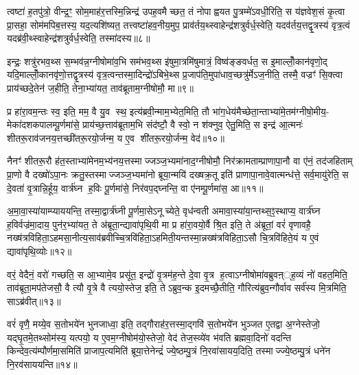 त्वष्टा॑ ह॒तपु॑त्रो॒ वीन्द्र॒ꣳ॒ सोम॒माह॑र॒त्तस्मि॒न्निन्द्र॑ उपह॒वमैच्छत॒ तं नोपाह्वयत पु॒त्रम्मे॑ऽवधी॒रिति॒ स य॑ज्ञवेश॒सं कृ॒त्वा प्रा॒सहा॒ सोम॑मपिब॒त्तस्य॒ यद॒त्यशि॑ष्यत॒ तत्त्वष्टा॑हव॒नीय॒मुप॒ प्राव॑र्तय॒थ्स्वाहेन्द्र॑शत्रुर्वर्ध॒स्वेति॒ यदव॑र्तय॒त्तद्वृ॒त्रस्य॑ वृत्र॒त्वं यदब्र॑वी॒थ्स्वाहेन्द्र॑शत्रुर्वर्ध॒स्वेति॒ तस्मा॑दस्य॥८॥

इन्द्रः॒ शत्रु॑रभव॒थ्स स॒म्भव॑न्न॒ग्नीषोमा॑व॒भि सम॑भव॒थ्स इ॑षुमा॒त्रमि॑षुमात्रं॒ विष्व॑ङ्ङवर्धत॒ स इ॒माल्लोँ॒कान॑वृणो॒द् यदि॒माल्लोँ॒कानवृ॑णो॒त्तद्वृ॒त्रस्य॑ वृत्र॒त्वन्तस्मा॒दिन्द्रो॑ऽबिभे॒थ्स प्र॒जाप॑ति॒मुपा॑धाव॒च्छत्रु॑र्मेऽज॒नीति॒ तस्मै॒ वज्रꣳ॑ सि॒क्त्वा प्राय॑च्छदे॒तेन॑ ज॒हीति॒ तेना॒भ्या॑यत॒ ताव॑ब्रूताम॒ग्नीषोमौ॒ मा॥९॥

प्र हा॑रा॒वम॒न्तः स्व॒ इति॒ मम॒ वै यु॒व स्थ॒ इत्य॑ब्रवी॒न्माम॒भ्येत॒मिति॒ तौ भा॑ग॒धेय॑मैच्छेता॒न्ताभ्या॑मे॒तम॑ग्नीषो॒मीय॒- मेका॑दशकपालम्पू॒र्णमा॑से॒ प्राय॑च्छ॒त्ताव॑ब्रूताम॒भि संद॑ष्टौ॒ वै स्वो॒ न श॑क्नुव॒ ऐतु॒मिति॒ स इन्द्र॑ आ॒त्मनः॑ शीतरू॒राव॑जनय॒त्तच्छी॑तरू॒रयो॒र्जन्म॒ य ए॒व शी॑तरू॒रयो॒र्जन्म॒ वेद॑॥१०॥

नैनꣳ॑ शीतरू॒रौ ह॑त॒स्ताभ्या॑मेनम॒भ्य॑नय॒त्तस्माज्जञ्ज॒भ्यमा॑नाद॒ग्नीषोमौ॒ निर॑क्रामताम्प्राणापा॒नौ वा ए॑नं॒ तद॑जहिताम् प्रा॒णो वै दख्षो॑ऽपा॒नः क्रतु॒स्तस्माज्जञ्ज॒भ्यमा॑नो ब्रूया॒न्मयि॑ दख्षक्र॒तू इति॑ प्राणापा॒नावे॒वात्मन्ध॑त्ते॒ सर्व॒मायु॑रेति॒ स दे॒वता॑ वृ॒त्रान्नि॒र्\mbox{}हूय॒ वार्त्र॑घ्न ह॒विः पू॒र्णमा॑से॒ निर॑वप॒द्घ्नन्ति॒ वा ए॑नम्पू॒र्णमा॑स॒ आ॥११॥

अ॒मा॒वा॒स्या॑याम्प्याययन्ति॒ तस्मा॒द्वार्त्र॑घ्नी पू॒र्णमा॒सेऽनूच्येते॒ वृध॑न्वती अमावा॒स्या॑या॒न्तथ्स॒ꣵ॒स्थाप्य॒ वार्त्र॑घ्न ह॒विर्वज्र॑मा॒दाय॒ पुन॑र॒भ्या॑यत॒ ते अ॑ब्रूता॒न्द्यावा॑पृथि॒वी मा प्र हा॑रा॒वयो॒र्वै श्रि॒त इति॒ ते अ॑ब्रूतां॒ वरं॑ वृणावहै॒ नख्ष॑त्रविहिता॒ऽहमसा॒नीत्य॒साव॑ब्रवीच्चि॒त्रवि॑हिता॒ऽहमिती॒यन्तस्मा॒न्नख्ष॑त्रविहिता॒ऽसौ चि॒त्रवि॑हिते॒यं य ए॒वं द्यावा॑पृथि॒व्योः॥१२॥

वरं॒ वेदैनं॒ वरो॑ गच्छति॒ स आ॒भ्यामे॒व प्रसू॑त॒ इन्द्रो॑ वृ॒त्रम॑ह॒न्ते दे॒वा वृ॒त्र ह॒त्वाऽग्नीषोमा॑वब्रुवऩ््ह॒व्यं नो॑ वहत॒मिति॒ ताव॑ब्रूता॒मप॑तेजसौ॒ वै त्यौ वृ॒त्रे वै त्ययो॒स्तेज॒ इति॒ तेऽब्रुव॒न्क इ॒दमच्छै॒तीति॒ गौरित्य॑ब्रुव॒न्गौर्वाव सर्व॑स्य मि॒त्रमिति॒ साऽब्र॑वीत्॥१३॥

वरं॑ वृणै॒ मय्ये॒व स॒तोभये॑न भुनजाध्वा॒ इति॒ तद्गौराह॑र॒त्तस्मा॒द्गवि॑ स॒तोभये॑न भुञ्जत ए॒तद्वा अ॒ग्नेस्तेजो॒ यद्घृ॒तमे॒तथ्सोम॑स्य॒ यत्पयो॒ य ए॒वम॒ग्नीषोम॑यो॒स्तेजो॒ वेद॑ तेज॒स्व्ये॑व भ॑वति ब्रह्मवा॒दिनो॑ वदन्ति किन्देव॒त्य॑म्पौर्णमा॒समिति॑ प्राजाप॒त्यमिति॑ ब्रूया॒त्तेनेन्द्रं॑ ज्ये॒ष्ठम्पु॒त्रं नि॒रवा॑सायय॒दिति॒ तस्माज्ज्ये॒ष्ठम्पु॒त्रं धने॑न नि॒रव॑साययन्ति॥१४॥

